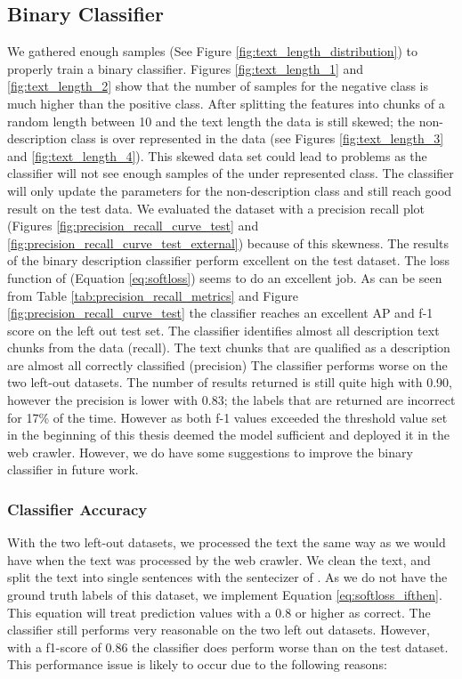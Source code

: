 \documentclass[a4paper, 12pt, oneside]{book} %
\begin{document}
\subsection{Binary Classifier}
We gathered enough samples (See Figure \ref{fig:text_length_distribution}) to properly train a binary classifier.
Figures \ref{fig:text_length_1} and \ref{fig:text_length_2} show that the number of samples for the negative class is much higher than the positive class. 
After splitting the features into chunks of a random length between 10 and the text length the data is still skewed; the non-description class is over represented in the data (see Figures \ref{fig:text_length_3} and \ref{fig:text_length_4}). 
This skewed data set could lead to problems as the classifier will not see enough samples of the under represented class. 
The classifier will only update the parameters for the non-description class and still reach good result on the test data.
We evaluated the dataset with a precision recall plot (Figures \ref{fig:precision_recall_curve_test} and \ref{fig:precision_recall_curve_test_external}) because of this skewness.
The results of the binary description classifier perform excellent on the test dataset. 
The loss function of \textcite{reed_training_2015} (Equation \ref{eq:softloss}) seems to do an excellent job.
As can be seen from Table \ref{tab:precision_recall_metrics} and Figure \ref{fig:precision_recall_curve_test} the classifier reaches an excellent AP and f-1 score on the left out test set.
The classifier identifies almost all description text chunks from the data (recall).
The text chunks that are qualified as a description are almost all correctly classified (precision)
The classifier performs worse on the two left-out datasets.
The number of results returned is still quite high with 0.90, however the precision is lower with 0.83; the labels that are returned are incorrect for 17\% of the time.
However as both f-1 values exceeded the threshold value set in the beginning of this thesis deemed the model sufficient and deployed it in the web crawler.
However, we do have some suggestions to improve the binary classifier in future work.

\subsubsection{Classifier Accuracy}
With the two left-out datasets, we processed the text the same way as we would have when the text was processed by the web crawler. 
We clean the text, and split the text into single sentences with the sentecizer of \textcite{honnibal_spacy_2020}.
As we do not have the ground truth labels of this dataset, we implement Equation \ref{eq:softloss_ifthen}.
This equation will treat prediction values with a 0.8 or higher as correct.
The classifier still performs very reasonable on the two left out datasets.
However, with a f1-score of 0.86 the classifier does perform worse than on the test dataset.
This performance issue is likely to occur due to the following reasons:
\end{document}
